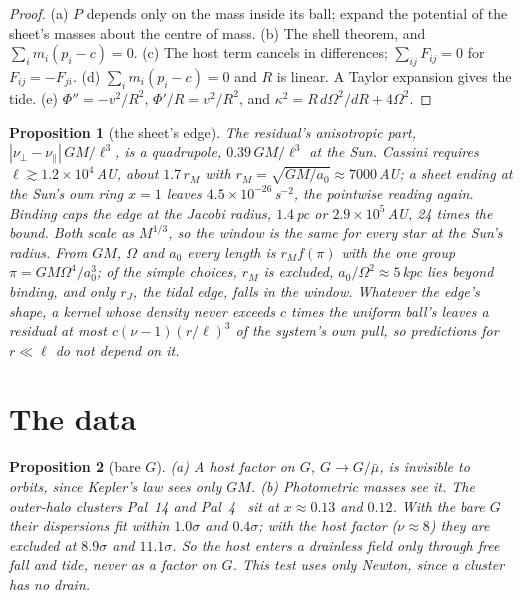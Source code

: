 \documentclass[twocolumn]{iopjournal}
\newtheorem{proposition}{Proposition}
\theoremstyle{definition}
\theoremstyle{remark}
\begin{document}
\begin{proof}
(a) $P$ depends only on the mass inside its ball; expand the potential
of the sheet's masses about the centre of mass. (b) The shell theorem,
and $\sum_i m_i(p_i - c) = 0$.
(c) The host term cancels in differences; $\sum_{ij}F_{ij} = 0$ for
$F_{ij} = -F_{ji}$. (d) $\sum_i m_i(p_i - c) = 0$ and $R$ is linear. A
Taylor expansion gives the tide. (e) $\Phi'' = -v^2/R^2$,
$\Phi'/R = v^2/R^2$, and $\kappa^2 = R\,d\Omega^2/dR + 4\Omega^2$.
\end{proof}

\begin{proposition}[the sheet's edge]\label{prop:edge}
The residual's anisotropic part, $|\nu_\perp - \nu_\parallel|\,GM/\ell^3$,
is a quadrupole, $0.39\,GM/\ell^3$ at the Sun. Cassini requires
$\ell \gtrsim 1.2 \times 10^4$\,AU, about $1.7\,r_M$ with
$r_M = \sqrt{GM/a_0} \approx 7000$\,AU; a sheet ending at the Sun's own
ring $x = 1$ leaves $4.5 \times 10^{-26}$\,s$^{-2}$, the pointwise reading
again. Binding caps the edge at the Jacobi radius, $1.4$\,pc or
$2.9 \times 10^5$\,AU, 24 times the bound. Both scale as $M^{1/3}$, so the
window is the same for every star at the Sun's radius. From $GM$, $\Omega$
and $a_0$ every length is $r_M f(\pi)$ with the one group
$\pi = GM\Omega^4/a_0^3$; of the simple choices, $r_M$ is excluded,
$a_0/\Omega^2 \approx 5$\,kpc lies beyond binding, and only $r_J$, the
tidal edge, falls in the window. Whatever the edge's shape, a kernel
whose density never exceeds $c$ times the uniform ball's leaves a
residual at most $c(\nu-1)(r/\ell)^3$ of the system's own pull, so
predictions for $r \ll \ell$ do not depend on it.
\end{proposition}

\section*{The data}

\begin{proposition}[bare $G$]\label{prop:data}
(a) A host factor on $G$, $G \to G/\bar\mu$, is invisible to orbits,
since Kepler's law sees only $GM$. (b) Photometric masses see it. The
outer-halo clusters Pal~14 and Pal~4~\cite{Jordi2009,Frank2012} sit at
$x \approx 0.13$ and $0.12$. With the bare $G$ their dispersions fit
within $1.0\sigma$ and $0.4\sigma$; with the host factor
($\nu \approx 8$) they are excluded at $8.9\sigma$ and $11.1\sigma$. So
the host enters a drainless field only through free fall and tide, never
as a factor on $G$. This test uses only Newton, since a cluster has no
drain.
\end{proposition}
\end{document}
